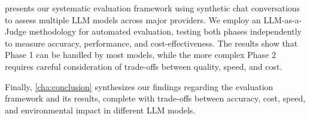  presents our systematic evaluation framework using synthetic chat conversations to assess multiple LLM models across major providers.
We employ an LLM-as-a-Judge methodology for automated evaluation, testing both phases independently to measure accuracy, performance, and cost-effectiveness.
The results show that Phase 1 can be handled by most models, while the more complex Phase 2 requires careful consideration of trade-offs between quality, speed, and cost.

Finally, \cref{cha:conclusion} synthesizes our findings regarding the evaluation framework and its results, complete with trade-offs between accuracy, cost, speed, and environmental impact in different LLM models.

